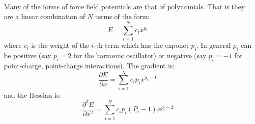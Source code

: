 Many of the forms of force field potentials are that of polynomials. That is they are a linear combination of $N$ terms of the form\+: \[ E=\sum_{i=1}^Nc_ix^{p_i} \] where $c_i$ is the weight of the $i$-\/th term which has the exponet $p_i$. In general $p_i$ can be positive (say $p_i=2$ for the harmonic oscillator) or negative (say $p_i=-1$ for point-\/charge, point-\/charge interactions). The gradient is\+: \[ \frac{\partial E}{\partial x}=\sum_{i=1}^N c_ip_i x^{p_i-1} \] and the Hessian is\+: \[ \frac{\partial^2 E}{\partial x^2}=\sum_{i=1}^N c_ip_i(P_i-1)x^{p_i-2} \] 